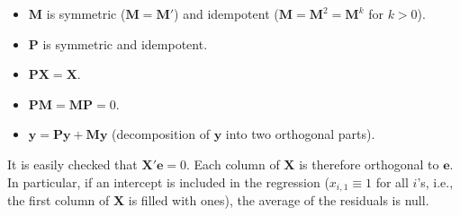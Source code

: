 \documentclass[
  11pt,
]{book}
\providecommand{\tightlist}{%
  \setlength{\itemsep}{0pt}\setlength{\parskip}{0pt}}
\theoremstyle{definition}
\theoremstyle{definition}
\theoremstyle{definition}
\theoremstyle{definition}
\theoremstyle{remark}
\begin{document}
\begin{itemize}
\tightlist
\item
  \(\mathbf{M}\) is symmetric (\(\mathbf{M} = \mathbf{M}'\)) and idempotent (\(\mathbf{M} = \mathbf{M}^2 = \mathbf{M}^k\) for \(k>0\)).
\item
  \(\mathbf{P}\) is symmetric and idempotent.
\item
  \(\mathbf{P}\mathbf{X} = \mathbf{X}\).
\item
  \(\mathbf{P} \mathbf{M} = \mathbf{M} \mathbf{P} = 0\).
\item
  \(\mathbf{y} = \mathbf{P}\mathbf{y} + \mathbf{M}\mathbf{y}\) (decomposition of \(\mathbf{y}\) into two orthogonal parts).
\end{itemize}

It is easily checked that \(\mathbf{X}'\mathbf{e}=0\). Each column of \(\mathbf{X}\) is therefore orthogonal to \(\mathbf{e}\). In particular, if an intercept is included in the regression (\(x_{i,1} \equiv 1\) for all \(i\)'s, i.e., the first column of \(\mathbf{X}\) is filled with ones), the average of the residuals is null.
\end{document}
